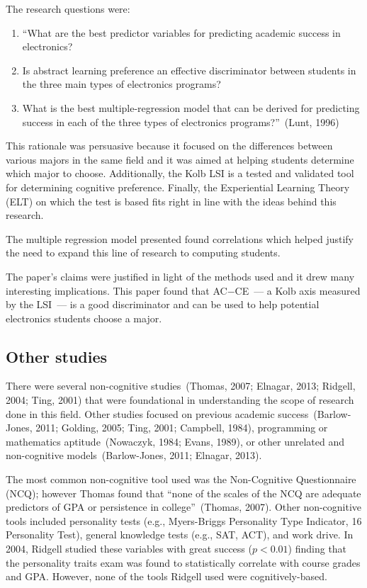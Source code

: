 The research questions were:
\begin{enumerate}
  \item ``What are the best predictor variables for predicting academic success in electronics?
  \item Is abstract learning preference an effective discriminator between students in the three main types of electronics programs?
  \item What is the best multiple-regression model that can be derived for predicting success in each of the three types of electronics programs?''~(Lunt, 1996)
\end{enumerate}

This rationale was persuasive because it focused on the differences between various majors in the same field and it was aimed at helping students determine which major to choose. Additionally, the Kolb LSI is a tested and validated tool for determining cognitive preference. Finally, the Experiential Learning Theory (ELT) on which the test is based fits right in line with the ideas behind this research.

The multiple regression model presented found correlations which helped justify the need to expand this line of research to computing students.

The paper's claims were justified in light of the methods used and it drew many interesting implications. This paper found that AC$-$CE~--- a Kolb axis measured by the LSI~--- is a good discriminator and can be used to help potential electronics students choose a major.

\subsection{Other studies}
There were several non-cognitive studies~(Thomas, 2007; Elnagar, 2013; Ridgell, 2004; Ting, 2001) that were foundational in understanding the scope of research done in this field. Other studies focused on previous academic success~(Barlow-Jones, 2011; Golding, 2005; Ting, 2001; Campbell, 1984), programming or mathematics aptitude~(Nowaczyk, 1984; Evans, 1989), or other unrelated and non-cognitive models~(Barlow-Jones, 2011; Elnagar, 2013).

The most common non-cognitive tool used was the Non-Cognitive Questionnaire (NCQ); however Thomas found that ``none of the scales of the NCQ are adequate predictors of GPA or persistence in college''~(Thomas, 2007). Other non-cognitive tools included personality tests (e.g., Myers-Briggs Personality Type Indicator, 16 Personality Test), general knowledge tests (e.g., SAT, ACT), and work drive. In 2004, Ridgell studied these variables with great success ($p<0.01$) finding that the personality traits exam was found to statistically correlate with course grades and GPA. However, none of the tools Ridgell used were cognitively-based.

